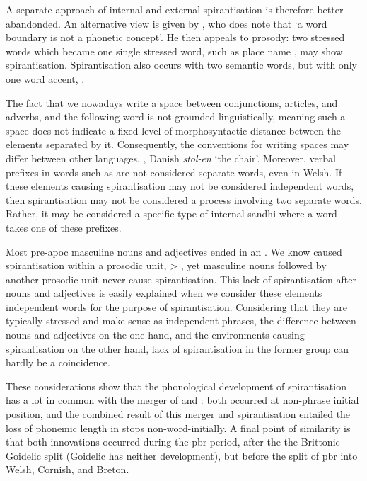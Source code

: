 A separate approach of internal and external spirantisation is therefore better abandonded. An alternative view is given by \textcite[126--129]{koch_neo-brittonic_1989}, who does note that `a word boundary is not a phonetic concept'.
He then appeals to prosody: two stressed words which became one single stressed word, such as place name , may show spirantisation.
Spirantisation also occurs with two semantic words, but with only one word accent, \eg {}.

The fact that we nowadays write a space between conjunctions, articles, and adverbs, \etc and the following word is not grounded linguistically, meaning such a space does not indicate a fixed level of morphosyntactic distance between the elements separated by it. Consequently, the conventions for writing spaces may differ between other languages, \eg {}, Danish \textit{stol-en} `the chair'.
Moreover, verbal prefixes in words such as  are not considered separate words, even in Welsh.
If  these elements causing spirantisation may not be considered independent words, then spirantisation may not be considered a process involving two separate words.
Rather, it may be considered a specific type of internal sandhi where a word takes one of these prefixes.

Most pre-\gls{apoc} masculine  nouns and adjectives ended in an .
We know  caused spirantisation within a prosodic unit, \eg {} > , yet masculine nouns followed by another prosodic unit never cause spirantisation.
This lack of spirantisation after nouns and adjectives is easily explained when we consider these elements independent words for the purpose of spirantisation.
Considering that they are typically stressed and make sense as independent phrases, the difference between nouns and adjectives on the one hand, and the environments causing spirantisation on the other hand, lack of spirantisation in the former group can hardly be a coincidence.

These considerations show that the phonological development of spirantisation has a lot in common with the merger of \xD and \lT: both occurred at non-phrase initial position, and the combined result of this merger and spirantisation entailed the loss of phonemic length in stops non-word-initially.
A final point of similarity is that both innovations occurred during the \gls{pbr} period, after the the Brittonic-Goidelic split (Goidelic has neither development), but before the split of \gls{pbr} into Welsh, Cornish, and Breton.

